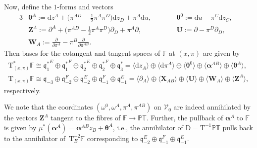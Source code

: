 \documentclass[pdftex]{sigma}
\numberwithin{equation}{section}
\newcommand{\parderv}[2] {\frac{\partial#1}{\partial#2}}
\newcommand{\mc} [1]{\mathcal{#1}}
\newcommand{\Drm} {{\mathrm{D}}}
\newcommand{\dd} {\mathrm{d}}
\newcommand{\Tgt} {\mathrm{T}}
\newcommand{\mfq} {\mathfrak{q}}
\newcommand{\PT} {\mathbb{PT}}
\newcommand{\F} {\mathbb{F}}
\begin{document}
Now, def\/ine the $1$-forms and vectors
\begin{alignat*}{3}
& \bm{\theta}^A := \dd z^A + \big( \pi^{AD} - \tfrac{1}{2} \pi^{A} \pi^D \big) \dd z_D + \pi^A \dd u ,\qquad && \bm{\theta}^0 := \dd u - \pi^C \dd z_C , &\\
& \bm{Z}^{A} := \partial ^{A} + \big( \pi^{AD} - \tfrac{1}{2} \pi^{A} \pi^D \big) \partial _D + \pi^{A} \partial , \qquad &&
\bm{U} := \partial - \pi^D \partial _D ,& \\
 & \bm{W}_{A} := \parderv{}{\pi^{A}} - \pi^{B} \parderv{}{\pi^{AB}} .&&&
\end{alignat*}
Then bases for the cotangent and tangent spaces of $\F$ at $(x,\pi)$ are given by
\begin{subequations}
\begin{gather*}
\Tgt^*_{(x,\pi)} \F \cong {\mfq^*_1}^E \oplus {\mfq_1^*}^F \oplus {\mfq_2^*}^E \oplus {\mfq_2^*}^F \oplus \mfq_3^*
= \langle \dd z_A \rangle \oplus \big\langle \dd \pi^A \big\rangle \oplus \langle \bm{\theta}^0 \rangle \oplus \big\langle \bm{\alpha}^{AB} \big\rangle \oplus \big\langle \bm{\theta}^A \big\rangle , \\ %
\Tgt_{(x,\pi)} \F \cong \mfq_{-3} \oplus \mfq_{-2}^F \oplus \mfq_{-2}^E \oplus \mfq_{-1}^F \oplus \mfq_{-1}^E
= \langle \partial_{A} \rangle \oplus \langle \bm{X}_{AB} \rangle \oplus \langle \bm{U} \rangle \oplus \langle \bm{W}_{A} \rangle \oplus \big\langle \bm{Z}^{A} \big\rangle , %
\end{gather*}
\end{subequations}
respectively.

We note that the coordinates $(\omega^0,\omega^A,\pi^A,\pi^{AB})$ on $\mc{V}_0$ are indeed annihilated by the vectors $\bm{Z}^A$ tangent to the f\/ibres of $\F \rightarrow \PT$. Further, the pullback of $\bm{\alpha}^A$ to $\F$ is given by $\mu^* (\bm{\alpha}^A ) = \bm{\alpha}^{AB} z_B + \bm{\theta}^A$, i.e., the annihilator of $\Drm = \Tgt^{-1} \PT$ pulls back to the annihilator of~$\Tgt^{-2}_E \F$ corresponding to $\mfq_{-2}^E \oplus \mfq_{-1}^F \oplus \mfq_{-1}^E$.
\end{document}
